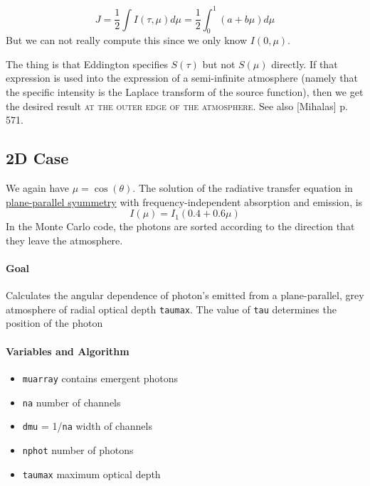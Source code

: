 \documentclass[../main/main.tex]{subfiles}
\begin{document}
\begin{equation}
J = \frac{1}{2} \int I(\tau,\mu) d\mu = \frac{1}{2} \int_0^1 (a+b\mu)d\mu
\end{equation}
But we can not really compute this since we only know $I(0,\mu)$.

The thing is that Eddington specifies $S(\tau)$ but not $S(\mu)$ directly. If that expression is used into the expression of a semi-infinite atmosphere (namely that the specific intensity is the Laplace transform of the source function), then we get the desired result \textsc{at the outer edge of the atmosphere}. See also [Mihalas] p. 571.

\noindent{}

\subsection{2D Case}
We again have $\mu = \cos(\theta)$. The solution of the radiative transfer equation in \underline{plane-parallel syummetry} with frequency-independent absorption and emission, is 
\begin{equation}
I(\mu) = I_1 (0.4 + 0.6\mu)
\label{2D_case_Eddington_barbier}
\end{equation}
In the Monte Carlo code, the photons are sorted according to the direction that they leave the atmosphere.

\paragraph{Goal}
Calculates the angular dependence of photon's emitted from a plane-parallel, grey atmosphere of radial optical depth \texttt{taumax}. The value of \texttt{tau} determines the position of the photon

\paragraph{Variables and Algorithm}
\begin{itemize}
\item \texttt{muarray} contains emergent photons
\item \texttt{na} number of channels
\item \texttt{dmu} = 1/\texttt{na} width of channels
\item \texttt{nphot} number of photons
\item \texttt{taumax} maximum optical depth
\end{itemize}
\end{document}
